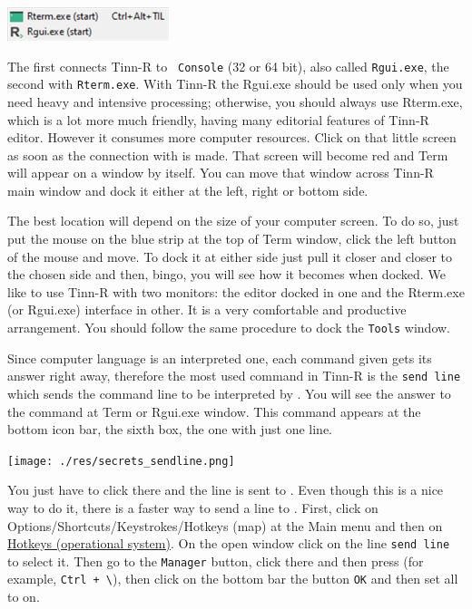 \vspace{5mm}
\includegraphics[scale=0.80]{./res/secrets_connecting.png}
\vspace{5mm}

The first connects Tinn-R to \texttt{\RR{} Console} (32 or 64 bit), also called \texttt{Rgui.exe},
the second with \texttt{Rterm.exe}. With Tinn-R the Rgui.exe should be used only when you need heavy and intensive processing;
otherwise, you should always use Rterm.exe, which is a lot more much friendly, having many editorial features of Tinn-R editor.
However it consumes more computer resources. Click on that little screen as soon as the connection with \RR{} is made.
That screen will become red and Term will appear on a window by itself. You can move that window across Tinn-R main
window and dock it either at the left, right or bottom side.

The best location will depend on the size of your computer screen. To do so, just put the mouse on the blue strip
at the top of Term window, click the left button of the mouse and move.
To dock it at either side just pull it closer and closer to the chosen side and then, bingo,
you will see how it becomes when docked. We like to use Tinn-R with two monitors:
the editor docked in one and the Rterm.exe (or Rgui.exe) interface in other.
It is a very comfortable and productive arrangement.
You should follow the same procedure to dock the \texttt{Tools} window.

Since \RR{} computer language is an interpreted one, each command given gets its answer right away,
therefore the most used command in Tinn-R is the \texttt{send line} which sends the command line to be interpreted by \RR{}.
You will see the answer to the command at Term or Rgui.exe window.
This command appears at the bottom icon bar, the sixth box, the one with just one line.

\vspace{5mm}
\texttt{[image: ./res/secrets\_sendline.png]}
\vspace{5mm}

You just have to click there and the line is sent to \RR{}. Even though this is a nice way to do it,
there is a faster way to send a line to \RR{}. First, click on Options/Shortcuts/Keystrokes/Hotkeys (map) at the Main menu and then on
\href{\#working\_hotkeys}{Hotkeys (operational system)}.
On the open window click on the line \texttt{send line} to select it.
Then go to the \texttt{Manager} button, click there and then press (for example, \texttt{Ctrl + \textbackslash{}}),
then click on the bottom bar the button \texttt{OK} and then set all to on. \\

